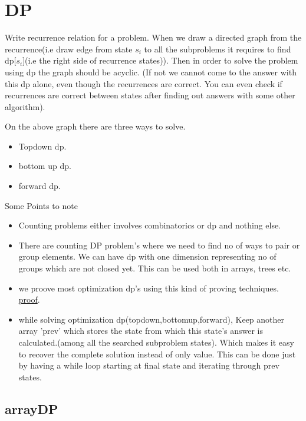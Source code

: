 \documentclass[../Notes.tex]{subfiles}
\begin{document}
\chapter{DP}

Write recurrence relation for a problem. When we draw a directed graph from the recurrence(i.e draw edge from state $s_i$ to all the subproblems it requires to find dp[$s_i$](i.e the right side of recurrence states)). Then in order to solve the problem using dp the graph should be acyclic. (If not we cannot come to the answer with this dp alone, even though the recurrences are correct. You can even check if recurrences are correct between states after finding out answers with some other algorithm).

On the above graph there are three ways to solve.
\begin{itemize}
	\item Topdown dp.
	\item bottom up dp.
	\item forward dp.
\end{itemize}	
Some Points to note
\begin{itemize}
	\item Counting problems either involves combinatorics or dp and nothing else.
	\item There are counting DP problem's where we need to find no of ways to pair or group elements. We can have dp with one dimension representing no of groups which are not closed yet. This can be used both in arrays, trees etc.  
	\item we proove most optimization dp's using this kind of proving techniques.
	\href{Material/dpproof.pdf}{proof}.\pagebreak
	\item while solving optimization dp(topdown,bottomup,forward), Keep another array 'prev' which stores the state from which this state's answer is calculated.(among all the searched subproblem states). Which makes it easy to recover the complete solution instead of only value. This can be done just by having a while loop starting at final state and iterating through prev states. 
\end{itemize}

\section{arrayDP}
\end{document}
